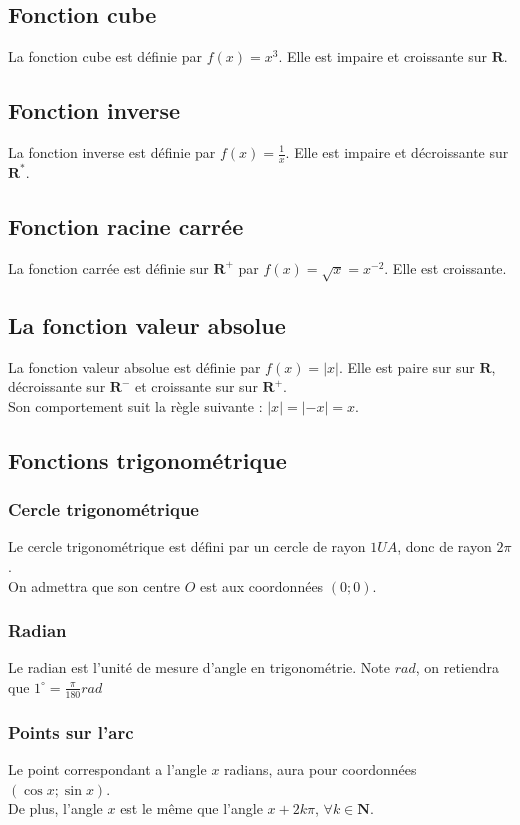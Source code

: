 \documentclass{article}
\begin{document}
\subsection{Fonction cube}
    La fonction cube est définie par $f(x) = x^3$. Elle est impaire et croissante sur $\mathbf{R}$.


\subsection{Fonction inverse}
    La fonction inverse est définie par $f(x) = \frac{1}{x}$. Elle est impaire et décroissante sur $\mathbf{R^*}$.


\subsection{Fonction racine carrée}
    La fonction carrée est définie sur $\mathbf{R^+}$ par $f(x) = \sqrt{x} = x^{-2}$. Elle est croissante.


\subsection{La fonction valeur absolue}
    La fonction valeur absolue est définie par $f(x) = |x| $. Elle est paire sur sur $\mathbf{R}$, décroissante sur $\mathbf{R^-}$ et croissante sur sur $\mathbf{R^+}$.\\
    Son comportement suit la règle suivante : $|x| = |-x| = x$.


\subsection{Fonctions trigonométrique }

\subsubsection{Cercle trigonométrique}
    Le cercle trigonométrique est défini par un cercle de rayon $1 UA$, donc de rayon $2\pi$.\\
    On admettra que son centre $O$ est aux coordonnées $(0;0)$.

\subsubsection{Radian}
    Le radian est l'unité de mesure d'angle en trigonométrie. Note $rad$, on retiendra que $1^\circ= \frac{\pi}{180} rad$

\subsubsection{Points sur l'arc}
    Le point correspondant a l'angle $x$ radians, aura pour coordonnées $(\cos{x};\sin{x})$. \\De plus, l'angle $x$ est le même que l'angle $x +2k\pi$, $\forall k \in \mathbf{N}$.
\end{document}

